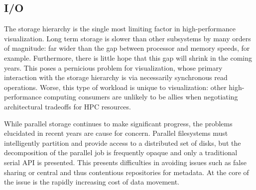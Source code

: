 

\subsection{I/O}

The storage hierarchy is the single most limiting factor in
high-performance visualization.  Long term storage is slower than other
subsystems by many orders of magnitude: far wider than the gap between
processor and memory speeds, for example.  Furthermore, there is little
hope that this gap will shrink in the coming years.  This poses a
pernicious problem for visualization, whose primary interaction with
the storage hierarchy is via necessarily synchronous read operations.
Worse, this type of workload is unique to visualization: other
high-performance computing consumers are unlikely to be allies when
negotiating architectural tradeoffs for HPC resources.


While parallel storage continues to make significant progress, the
problems elucidated in recent years are cause for concern.  Parallel
filesystems must intelligently partition and provide access to a
distributed set of disks, but the decomposition of the parallel job
is frequently opaque and only a traditional serial API is presented.
This presents difficulties in avoiding issues such as false sharing or
central and thus contentious repositories for metadata.  At the core of
the issue is the rapidly increasing cost of data movement.


